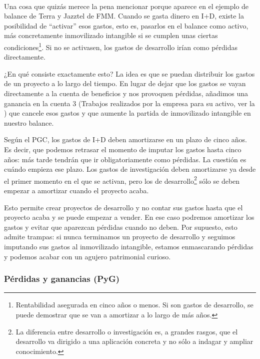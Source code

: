 \documentclass[nochap,palatino,notitlepage]{apuntes}
\begin{document}
\paragraph{} Una cosa que quizás merece la pena mencionar porque aparece en el ejemplo de balance de Terra y Jazztel de FMM. Cuando se gasta dinero en I+D, existe la posibilidad de ``activar'' esos gastos, esto es, pasarlos en el balance como activo, más concretamente inmovilizado intangible si se cumplen unas ciertas condiciones\footnote{Rentabilidad asegurada en cinco años o menos. Si son gastos de desarrollo, se puede demostrar que se van a amortizar a lo largo de más años.}. Si no se activasen, los gastos de desarrollo irían como pérdidas directamente.

¿En qué consiste exactamente esto? La idea es que se puedan distribuir los gastos de un proyecto a lo largo del tiempo. En lugar de dejar que los gastos se vayan directamente a la cuenta de beneficios y nos provoquen pérdidas, añadimos una ganancia en la cuenta 3 (Trabajos realizados por la empresa para su activo, ver la ) que cancele esos gastos y que aumente la partida de inmovilizado intangible en nuestro balance.

Según el PGC, los gastos de I+D deben amortizarse en un plazo de cinco años. Es decir, que podemos retrasar el momento de imputar los gastos hasta cinco años: más tarde tendrán que ir obligatoriamente como pérdidas. La cuestión es cuándo empieza ese plazo. Los gastos de investigación deben amortizarse ya desde el primer momento en el que se activan, pero los de desarrollo\footnote{La diferencia entre desarrollo o investigación es, a grandes rasgos, que el desarrollo va dirigido a una aplicación concreta y no sólo a indagar y ampliar conocimiento.} sólo se deben empezar a amortizar cuando el proyecto acaba.

Esto permite crear proyectos de desarrollo y no contar sus gastos hasta que el proyecto acaba y se puede empezar a vender. En ese caso podremos amortizar los gastos y evitar que aparezcan pérdidas cuando no deben. Por supuesto, esto admite trampas: si nunca terminamos un proyecto de desarrollo y seguimos imputando sus gastos al inmovilizado intangible, estamos enmascarando pérdidas y podemos acabar con un agujero patrimonial curioso.

\subsubsection{Pérdidas y ganancias (PyG)}
\end{document}
